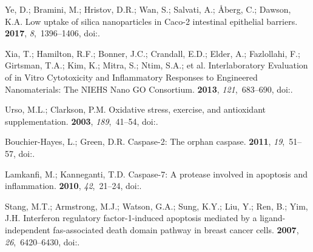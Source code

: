 \documentclass[ijms,article,accept,moreauthors,pdftex]{Definitions/mdpi}
\begin{document}
\begin{thebibliography}{999}
Ye, D.; Bramini, M.; Hristov, D.R.; Wan, S.; Salvati, A.; {\AA}berg, C.;
  Dawson, K.A.
\newblock Low uptake of silica nanoparticles in Caco-2 intestinal epithelial
  barriers.
 {\bf 2017}, {\em
  8},~1396--1406,
\newblock
  doi:{\href{https://doi.org/10.3762/bjnano.8.141}{}}.

Xia, T.; Hamilton, R.F.; Bonner, J.C.; Crandall, E.D.; Elder, A.; Fazlollahi,
  F.; Girtsman, T.A.; Kim, K.; Mitra, S.; Ntim, S.A.; et al.
\newblock Interlaboratory Evaluation of in Vitro Cytotoxicity and Inflammatory
  Responses to Engineered Nanomaterials: The {NIEHS} Nano {GO} Consortium.
 {\bf 2013}, {\em
  121},~683--690,
\newblock
  doi:{\href{https://doi.org/10.1289/ehp.1306561}{}}.

Urso, M.L.; Clarkson, P.M.
\newblock Oxidative stress, exercise, and antioxidant supplementation.
 {\bf 2003}, {\em 189},~41--54,
\newblock
  doi:{\href{https://doi.org/10.1016/s0300-483x(03)00151-3}{}}.

Bouchier-Hayes, L.; Green, D.R.
\newblock Caspase-2: The orphan caspase.
 {\bf 2011}, {\em 19},~51--57,
\newblock
  doi:{\href{https://doi.org/10.1038/cdd.2011.157}{}}.

Lamkanfi, M.; Kanneganti, T.D.
\newblock Caspase-7: A protease involved in apoptosis and inflammation.
  {\bf 2010}, {\em 42},~21--24,
\newblock
  doi:{\href{https://doi.org/10.1016/j.biocel.2009.09.013}{}}.

Stang, M.T.; Armstrong, M.J.; Watson, G.A.; Sung, K.Y.; Liu, Y.; Ren, B.; Yim,
  J.H.
\newblock Interferon regulatory factor-1-induced apoptosis mediated by a
  ligand-independent fas-associated death domain pathway in breast cancer
  cells.
 {\bf 2007}, {\em 26},~6420--6430,
\newblock
  doi:{\href{https://doi.org/10.1038/sj.onc.1210470}{}}.


\end{thebibliography}
\end{document}
